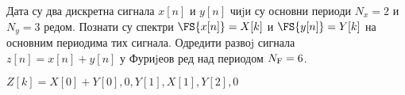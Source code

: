 \PID 
Дата су два дискретна сигнала $x[n]$ и $y[n]$ чиjи су основни периоди $N_x = 2$ и $N_y = 3$ редом. Познати су спектри
$\FS{x[n]} = X[k]$ и $\FS{y[n]} = Y [k]$ на основним периодима тих сигнала. Одредити развоj сигнала $z[n] = x[n] + y[n]$
у Фуриjеов ред над периодом $N_{\rm F} = 6$.
\vspace*{2mm}

\textsc{}
$Z[k] = {X[0] + Y [0], 0, Y [1], X[1], Y [2], 0}$